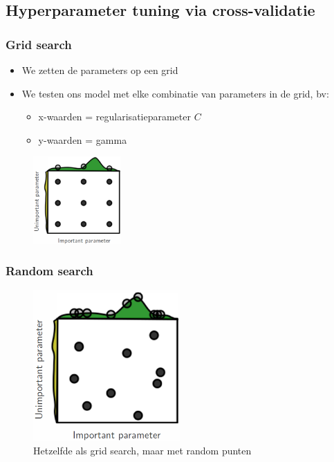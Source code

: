 \documentclass{article}
\begin{document}
\subsection{Hyperparameter tuning via cross-validatie}

\subsubsection{Grid search}

\begin{itemize}
    \item We zetten de parameters op een grid
    \item We testen ons model met elke combinatie van parameters in de grid, bv:
    \begin{itemize}
        \item x-waarden = regularisatieparameter $C$
        \item y-waarden = gamma
    \end{itemize}
\end{itemize}

\begin{figure}[H]
    \centering
    \includegraphics[width=0.3\textwidth]{grid-search.png}
    \caption{}
\end{figure}


\subsubsection{Random search}

\begin{figure}[H]
    \centering
    \includegraphics[width=0.5\textwidth]{random-search.png}
    \caption{Hetzelfde als grid search, maar met random punten}
\end{figure}
\end{document}

